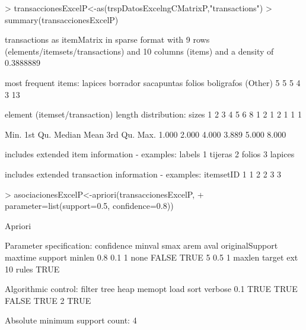 \documentclass [a4paper] {article}
\begin{document}
\begin{Schunk}
\begin{Sinput}
> transaccionesExcelP<-as(trspDatosExcelngCMatrixP,"transactions")
> summary(transaccionesExcelP)
\end{Sinput}
\begin{Soutput}
transactions as itemMatrix in sparse format with
 9 rows (elements/itemsets/transactions) and
 10 columns (items) and a density of 0.3888889 

most frequent items:
   lapices   borrador sacapuntas     folios boligrafos    (Other) 
         5          5          5          4          3         13 

element (itemset/transaction) length distribution:
sizes
1 2 3 4 5 6 8 
1 2 1 2 1 1 1 

   Min. 1st Qu.  Median    Mean 3rd Qu.    Max. 
  1.000   2.000   4.000   3.889   5.000   8.000 

includes extended item information - examples:
   labels
1 tijeras
2  folios
3 lapices

includes extended transaction information - examples:
  itemsetID
1         1
2         2
3         3
\end{Soutput}
\begin{Sinput}
> asociacionesExcelP<-apriori(transaccionesExcelP,
+ parameter=list(support=0.5, confidence=0.8))
\end{Sinput}
\begin{Soutput}
Apriori

Parameter specification:
 confidence minval smax arem  aval originalSupport maxtime support minlen
        0.8    0.1    1 none FALSE            TRUE       5     0.5      1
 maxlen target  ext
     10  rules TRUE

Algorithmic control:
 filter tree heap memopt load sort verbose
    0.1 TRUE TRUE  FALSE TRUE    2    TRUE

Absolute minimum support count: 4 


\end{Soutput}
\end{Schunk}
\end{document}
